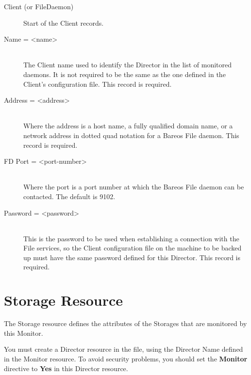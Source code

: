 \begin{description}

\item [Client (or FileDaemon)]
Start of the Client records.

\item [Name = {\textless}name{\textgreater}] \hfill \\
The Client name used to identify  the Director in the list of monitored
daemons. It is not required  to be the same as the one defined in the Client's
configuration file.  This record is required.

\item [Address = {\textless}address{\textgreater}] \hfill \\
Where the address is a host  name, a fully qualified domain name, or a network
address in  dotted quad notation for a Bareos File daemon.  This record is
required.

\item [FD Port = {\textless}port-number{\textgreater}] \hfill \\
Where the port is a port  number at which the Bareos File daemon can be
contacted.  The default is 9102.

\item [Password = {\textless}password{\textgreater}] \hfill \\
This is the password to be  used when establishing a connection with the File
services, so  the Client configuration file on the machine to be backed up
must  have the same password defined for this Director. This record is
required.
\end{description}

\section{Storage Resource}
\label{StorageResource1}

The Storage resource defines the attributes of the Storages that are monitored
by this Monitor.

You must create a Director resource in the
 file, using the
Director Name defined in the Monitor resource. To avoid security problems, you
should set the {\bf Monitor} directive to {\bf Yes} in this Director resource.

